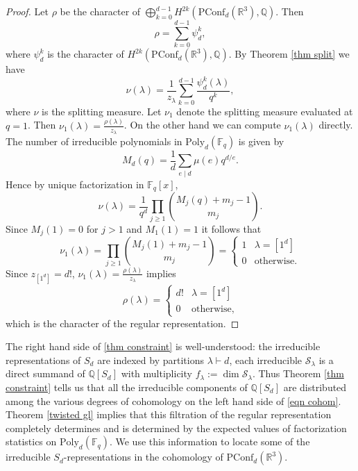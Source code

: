 \documentclass[submission]{FPSAC2018}
\theoremstyle{definition}
\numberwithin{equation}{section}
\def\QQ{\mathbb{Q}}
\def\FF{\mathbb{F}}
\def\RR{\mathbb{R}}
\newcommand\PConf{\mathrm{PConf}}
\newcommand{\poly}{\mathrm{Poly}}
\newcommand{\Sp}{\mathcal{S}}
\begin{document}
\begin{proof}
Let $\rho$ be the character of $\bigoplus_{k=0}^{d-1}H^{2k}(\PConf_d(\RR^3),\QQ)$. Then
\[
    \rho = \sum_{k=0}^{d-1} \psi_d^k,
\]
where $\psi_d^k$ is the character of $H^{2k}(\PConf_d(\RR^3),\QQ)$. By Theorem \ref{thm split} we have
\[
    \nu(\lambda) = \frac{1}{z_\lambda}\sum_{k=0}^{d-1} \frac{\psi_d^k(\lambda)}{q^k},
\]
where $\nu$ is the splitting measure. Let $\nu_1$ denote the splitting measure evaluated at $q = 1$. Then $\nu_1(\lambda) = \frac{\rho(\lambda)}{z_\lambda}$. On the other hand we can compute $\nu_1(\lambda)$ directly. The number of irreducible polynomials in $\poly_d(\FF_q)$ is given by
\[
    M_d(q) = \frac{1}{d}\sum_{e\mid d}\mu(e)q^{d/e}.
\]
Hence by unique factorization in $\FF_q[x]$,
\[
    \nu(\lambda) = \frac{1}{q^d}\prod_{j\geq 1}\binom{M_j(q) + m_j - 1}{m_j}.
\]
Since $M_j(1) = 0$ for $j > 1$ and $M_1(1) = 1$ it follows that
\[
    \nu_1(\lambda) = \prod_{j\geq 1}\binom{M_j(1) + m_j - 1}{m_j} = \begin{cases} 1 & \lambda = [1^d]\\ 0 & \text{otherwise.} \end{cases}
\]
Since $z_{[1^d]} = d!$, $\nu_1(\lambda) = \frac{\rho(\lambda)}{z_\lambda}$ implies
\[
    \rho(\lambda) = \begin{cases} d! & \lambda = [1^d]\\ 0 & \text{otherwise,} \end{cases}
\]
which is the character of the regular representation.
\end{proof}

The right hand side of \eqref{thm constraint} is well-understood: the irreducible representations of $S_d$ are indexed by partitions $\lambda\vdash d$, each irreducible $\Sp_\lambda$ is a direct summand of $\QQ[S_d]$ with multiplicity $f_\lambda := \dim \Sp_\lambda$. Thus Theorem \ref{thm constraint} tells us that all the irreducible components of $\QQ[S_d]$ are distributed among the various degrees of cohomology on the left hand side of \eqref{eqn cohom}. Theorem \ref{twisted gl} implies that this filtration of the regular representation completely determines and is determined by the expected values of factorization statistics on $\poly_d(\FF_q)$. We use this information to locate some of the irreducible $S_d$-representations in the cohomology of $\PConf_d(\RR^3)$.
\end{document}
